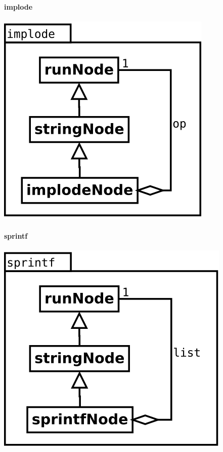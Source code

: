 \paragraph {implode}
\begin{center}
\includegraphics[scale=0.4]{implode.png} \\
\end{center}

\paragraph {sprintf}
\begin{center}
\includegraphics[scale=0.4]{sprintf.png} \\
\end{center}

